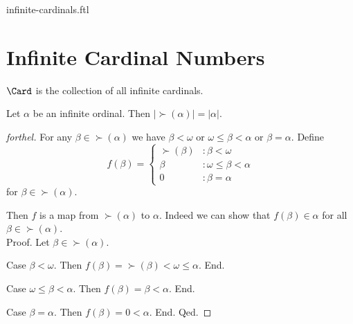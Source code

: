 \documentclass{naproche-library}
\begin{document}
\begin{smodule}{infinite-cardinals.ftl}

  
  \begin{forthel}
  \end{forthel}

  \section*{Infinite Cardinal Numbers}

  \begin{definition}[forthel,id=SET_THEORY_07_4231078585827328]
    $\Card$ is the collection of all infinite cardinals.
  \end{definition}

  \begin{proposition}[forthel,id=SET_THEORY_07_8189062544359424]
    Let $\alpha$ be an infinite ordinal.
    Then $|\succ(\alpha)| = |\alpha|$.
  \end{proposition}
  \begin{proof}[forthel]
    For any $\beta \in \succ(\alpha)$ we have
    $\beta < \omega$ or $\omega \leq \beta < \alpha$ or $\beta = \alpha$.
    Define \[ f(\beta) =
      \begin{cases}
        \succ(\beta)  & : \beta < \omega
        \\
        \beta         & : \omega \leq \beta < \alpha
        \\
        0             & : \beta = \alpha
      \end{cases} \]
    for $\beta \in \succ(\alpha)$.

    Then $f$ is a map from $\succ(\alpha)$ to $\alpha$.
    Indeed we can show that $f(\beta) \in \alpha$ for all
    $\beta \in \succ(\alpha)$. \\
    Proof.
      Let $\beta \in \succ(\alpha)$.

      Case $\beta < \omega$.
        Then $f(\beta)
          = \succ(\beta)
          < \omega
          \leq \alpha$.
      End.

      Case $\omega \leq \beta < \alpha$.
        Then $f(\beta)
          = \beta
          < \alpha$.
      End.

      Case $\beta = \alpha$.
        Then $f(\beta)
          = 0
          < \alpha$.
      End.
    Qed.


\end{proof}
\end{smodule}
\end{document}
